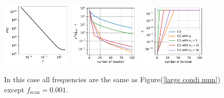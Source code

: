 \documentclass[twocolumn,linenumbers]{aastex631}
\begin{document}
\begin{figure}[htb!]
\centering
\includegraphics[width=0.3\textwidth]{0.001/large_condition_num/p_f.pdf}
\includegraphics[width=0.3\textwidth]{0.001/large_condition_num/chi2.pdf}
\includegraphics[width=0.3\textwidth]{0.001/large_condition_num/eta.pdf}
\caption{In this case all frequencies are the same as
    Figure(\ref{large condi num}) except $f_{\text{scan}} = 0.001$.
}
\label{large condi num 0.001}
\end{figure}
\end{document}
